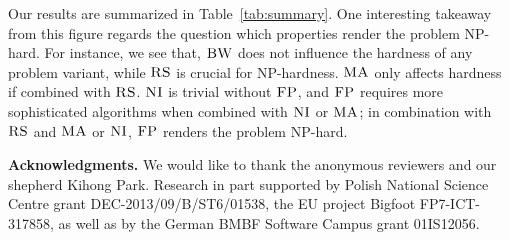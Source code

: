 \documentclass[conference,10pt]{IEEEtran}
\newcommand{\maciek}[1]{\textcolor{brown}{maciek: #1}}
\newcommand{\CC}{\textsc{NI}}
\newcommand{\FP}{\textsc{FP}}
\newcommand{\RS}{\textsc{RS}}
\newcommand{\BW}{\textsc{BW}}
\newcommand{\MA}{\textsc{MA}}
\begin{document}
Our results are summarized in
Table~\ref{tab:summary}.
One interesting takeaway from this figure regards
the question which properties render the problem
NP-hard. For instance, we see that, $\BW$
does not influence the hardness of any problem variant,
while $\RS$ is crucial for NP-hardness.
$\MA$ only affects hardness if combined with $\RS$.
$\CC$ is trivial without $\FP$, and $\FP$ requires
more sophisticated algorithms when combined with $\CC$ or $\MA$;
in combination with $\RS$ and $\MA$ or $\CC$, $\FP$ renders the
problem NP-hard.





\textbf{Acknowledgments.} We would like to thank the anonymous reviewers and our shepherd Kihong Park.
Research in part supported by Polish National Science Centre grant DEC-2013/09/B/ST6/01538, the EU project Bigfoot FP7-ICT-317858,
as well as by the German BMBF Software Campus grant 01IS12056.

%
{\footnotesize \renewcommand{\baselinestretch}{.9}


}

\end{document}

